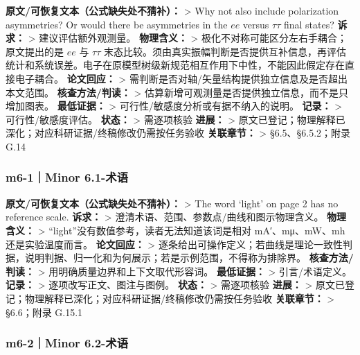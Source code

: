 \documentclass[
]{article}
\begin{document}
\textbf{原文/可恢复文本（公式缺失处不猜补）：} \textgreater{} Why not
also include polarization asymmetries? Or would there be asymmetries in
the \(ee\) versus \(\tau\tau\) final states? \textbf{诉求：}
\textgreater{} 建议评估额外观测量。 \textbf{物理含义：} \textgreater{}
极化不对称可能区分左右手耦合；原文提出的是 \(ee\) 与 \(\tau\tau\)
末态比较。须由真实振幅判断是否提供互补信息，再评估统计和系统误差。电子在原模型树级新规范相互作用下中性，不能因此假定存在直接电子耦合。
\textbf{论文回应：} \textgreater{}
需判断是否对轴/矢量结构提供独立信息及是否超出本文范围。
\textbf{核查方法/判读：} \textgreater{}
估算新增可观测量是否提供独立信息，而不是只增加图表。 \textbf{最低证据：}
\textgreater{} 可行性/敏感度分析或有据不纳入的说明。 \textbf{记录：}
\textgreater{} 可行性/敏感度评估。 \textbf{状态：} \textgreater{}
需逐项核验 \textbf{进展：} \textgreater{}
原文已登记；物理解释已深化；对应科研证据/终稿修改仍需按任务验收
\textbf{关联章节：} \textgreater{} §6.5、§6.5.2；附录 G.14

\subsubsection{m6-1｜Minor 6.1-术语}\label{m6-1minor-6.1-ux672fux8bed}

\textbf{原文/可恢复文本（公式缺失处不猜补）：} \textgreater{} The word
`light' on page 2 has no reference scale. \textbf{诉求：} \textgreater{}
澄清术语、范围、参数点/曲线和图示物理含义。 \textbf{物理含义：}
\textgreater{} ``light''没有数值参考，读者无法知道该词是相对
mA′、mμ、mW、mh 还是实验温度而言。 \textbf{论文回应：} \textgreater{}
逐条给出可操作定义；若曲线是理论一致性判据，说明判据、归一化和为何展示；若是示例范围，不得称为排除界。
\textbf{核查方法/判读：} \textgreater{}
用明确质量边界和上下文取代形容词。 \textbf{最低证据：} \textgreater{}
引言/术语定义。 \textbf{记录：} \textgreater{}
逐项改写正文、图注与图例。 \textbf{状态：} \textgreater{} 需逐项核验
\textbf{进展：} \textgreater{}
原文已登记；物理解释已深化；对应科研证据/终稿修改仍需按任务验收
\textbf{关联章节：} \textgreater{} §6.6；附录 G.15.1

\subsubsection{m6-2｜Minor 6.2-术语}\label{m6-2minor-6.2-ux672fux8bed}
\end{document}

